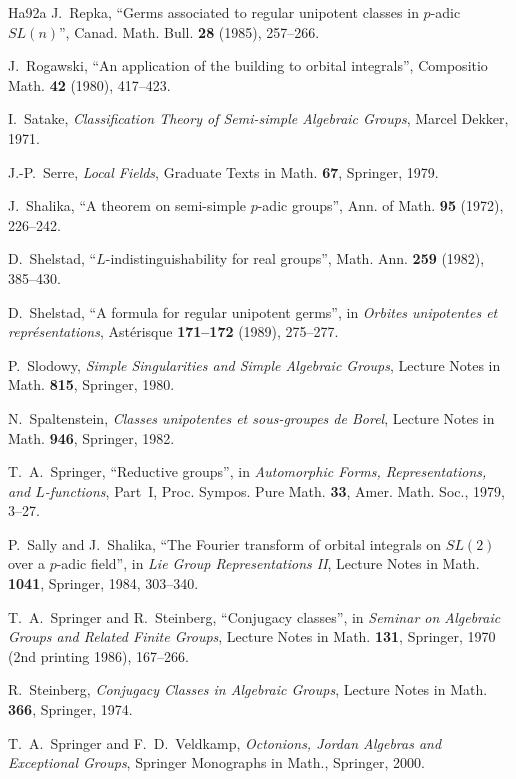 \documentclass[12pt,letterpaper]{amsart}
\theoremstyle{plain}
\theoremstyle{definition}
\theoremstyle{remark}
\theoremstyle{definition}
\begin{document}
\begin{thebibliography}{Ha92a}
 J.~Repka, ``Germs associated to regular unipotent
classes in $p$-adic $SL(n)$'', Canad. Math. Bull. \textbf{28} (1985),
257--266.

 J.~Rogawski, ``An application of the building to
orbital integrals'', Compositio Math. \textbf{42} (1980), 417--423.

 I.~Satake, \textit{Classification Theory of
Semi-simple Algebraic Groups}, Marcel Dekker, 1971.

 J.-P.~Serre, \textit{Local Fields}, Graduate Texts in
Math. \textbf{67}, Springer, 1979.

 J.~Shalika, ``A theorem on semi-simple $p$-adic
groups'', Ann. of Math. \textbf{95} (1972), 226--242.

 D.~Shelstad, ``$L$-indistinguishability for real
groups'', Math. Ann. \textbf{259} (1982), 385--430.

 D.~Shelstad, ``A formula for regular unipotent
germs'', in \textit{Orbites unipotentes et repr\'esentations}, Ast\'erisque
\textbf{171--172} (1989), 275--277.

 P.~Slodowy, \textit{Simple Singularities and Simple
Algebraic Groups}, Lecture Notes in Math. \textbf{815}, Springer, 1980.

 N.~Spaltenstein, \textit{Classes unipotentes et
sous-groupes de Borel}, Lecture Notes in Math. \textbf{946}, Springer, 1982.

 T.~A.~Springer, ``Reductive groups'', in
\textit{Automorphic Forms, Representations, and $L$-functions}, Part~I, Proc.
Sympos. Pure Math. \textbf{33}, Amer. Math. Soc., 1979, 3--27.

 P.~Sally and J.~Shalika, ``The Fourier transform of
orbital integrals on $SL(2)$ over a $p$-adic field'', in \textit{Lie Group
Representations II}, Lecture Notes in Math. \textbf{1041}, Springer, 1984,
303--340.

 T.~A.~Springer and R.~Steinberg, ``Conjugacy classes'',
in \textit{Seminar on Algebraic Groups and Related Finite Groups}, Lecture
Notes in Math. \textbf{131}, Springer, 1970 (2nd printing 1986), 167--266.

 R.~Steinberg, \textit{Conjugacy Classes in Algebraic
Groups}, Lecture Notes in Math. \textbf{366}, Springer, 1974.

 T.~A.~Springer and F.~D.~Veldkamp, \textit{Octonions,
Jordan Algebras and Exceptional Groups}, Springer Monographs in Math.,
Springer, 2000.


\end{thebibliography}
\end{document}
